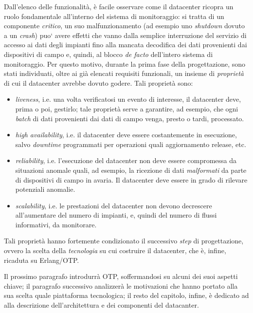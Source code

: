 %
Dall'elenco delle funzionalit\`a, \`e facile osservare come il
datacenter ricopra un ruolo fondamentale all'interno del sistema di monitoraggio: 
si tratta di un componente \emph{critico}, un suo malfunzionamento 
(ad esempio uno \emph{shutdown} dovuto a un \emph{crash}) puo` avere effetti che 
vanno dalla semplice interruzione del servizio di accesso ai dati degli impianti 
fino alla mancata decodifica dei dati provenienti dai dispositivi di campo e, 
quindi, al blocco \emph{de facto} dell'intero sistema di monitoraggio.
%
Per questo motivo, durante la prima fase della progettazione, sono stati 
individuati, oltre ai gi\`a elencati requisiti funzionali, un insieme di 
\emph{propriet\`a} di cui il datacenter avrebbe dovuto godere. Tali propriet\`a 
sono:
%
\begin{itemize}
\item \emph{liveness}, i.e. una volta verificatosi un evento di interesse, 
il datacenter deve, prima o poi, gestirlo; tale propriet\`a serve a garantire, ad 
esempio, che ogni \emph{batch} di dati provenienti dai dati di campo venga, 
presto o tardi, processato.
%
\item \emph{high availability}, i.e. il datacenter deve essere costantemente 
in esecuzione, salvo \emph{downtime} programmati per operazioni quali 
aggiornamento release, etc.
%
\item \emph{reliability}, i.e. l'esecuzione del datacenter non deve essere 
compromessa da situazioni anomale quali, ad esempio, la ricezione di dati 
\emph{malformati} da parte di dispositivi di campo in avaria. Il datacenter 
deve essere in grado di rilevare potenziali anomalie.%
%
\item \emph{scalability}, i.e. le prestazioni del datacenter non devono 
decrescere all'aumentare del numero di impianti, e, quindi del numero di 
flussi informativi, da monitorare. %
%
\end{itemize}
%

%
Tali propriet\`a hanno fortemente condizionato il successivo \emph{step} di
progettazione, ovvero la scelta della \emph{tecnologia} su cui costruire il 
datacenter, che \`e, infine, ricaduta su Erlang/OTP.
%

%
Il prossimo paragrafo introdurr\`a OTP, soffermandosi su alcuni dei suoi aspetti 
chiave; il paragrafo successivo analizzer\`a le motivazioni che hanno portato alla 
sua scelta quale piattaforma tecnologica; il resto del capitolo, infine, \`e dedicato 
ad alla descrizione dell'architettura e dei componenti del datacanter.
%


